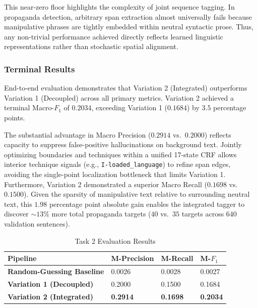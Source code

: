 \documentclass[12pt, a4paper]{article}
\begin{document}
This near-zero floor highlights the complexity of joint sequence tagging. In propaganda detection, arbitrary span extraction almost universally fails because manipulative phrases are tightly embedded within neutral syntactic prose. Thus, any non-trivial performance achieved directly reflects learned linguistic representations rather than stochastic spatial alignment.

\subsubsection{Terminal Results}
\label{subsubsec:task2_terminal_results}

End-to-end evaluation demonstrates that Variation 2 (Integrated) outperforms Variation 1 (Decoupled) across all primary metrics. Variation 2 achieved a terminal Macro-$F_1$ of $0.2034$, exceeding Variation 1 ($0.1684$) by $3.5$ percentage points.

The substantial advantage in Macro Precision ($0.2914$ vs.\ $0.2000$) reflects capacity to suppress false-positive hallucinations on background text. Jointly optimizing boundaries and techniques within a unified 17-state CRF allows interior technique signals (e.g., \texttt{I-loaded\_language}) to refine span edges, avoiding the single-point localization bottleneck that limits Variation 1. Furthermore, Variation 2 demonstrated a superior Macro Recall ($0.1698$ vs.\ $0.1500$). Given the sparsity of manipulative text relative to surrounding neutral text, this $1.98$ percentage point absolute gain enables the integrated tagger to discover $\sim 13\%$ more total propaganda targets ($40$ vs.\ $35$ targets across $640$ validation sentences).

\begin{table}[htbp]
  \centering
  \caption{Task 2 Evaluation Results}
  \label{tab:task2_terminal_results}
  \vspace{4pt}
  \small
  \setlength{\tabcolsep}{12pt}
  \begin{tabularx}{0.85\textwidth}{l l l l}
    \toprule
    \textbf{Pipeline} & \textbf{M-Precision} & \textbf{M-Recall} & \textbf{M-$F_1$} \\
    \midrule
    \textbf{Random-Guessing Baseline} & 0.0026 & 0.0028 & 0.0027 \\
    \addlinespace
    \textbf{Variation 1 (Decoupled)} & 0.2000 & 0.1500 & 0.1684 \\
    \addlinespace
    \textbf{Variation 2 (Integrated)} & \textbf{0.2914} & \textbf{0.1698} & \textbf{0.2034} \\
    \bottomrule
  \end{tabularx}
\end{table}
\end{document}

